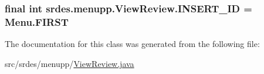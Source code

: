 \hypertarget{classsrdes_1_1menupp_1_1_view_review_a0b19054e74f550bc248b4fd16de8f7b4}{
\subsubsection[{\-I\-N\-S\-E\-R\-T\-\_\-\-I\-D}]{\setlength{\rightskip}{0pt plus 5cm}final int {\bf srdes.\-menupp.\-View\-Review.\-I\-N\-S\-E\-R\-T\-\_\-\-I\-D} = \-Menu.\-F\-I\-R\-S\-T}}\label{classsrdes_1_1menupp_1_1_view_review_a0b19054e74f550bc248b4fd16de8f7b4}


\-The documentation for this class was generated from the following file\-:\begin{DoxyCompactItemize}
\item 
src/srdes/menupp/\hyperlink{_view_review_8java}{\-View\-Review.\-java}\end{DoxyCompactItemize}

